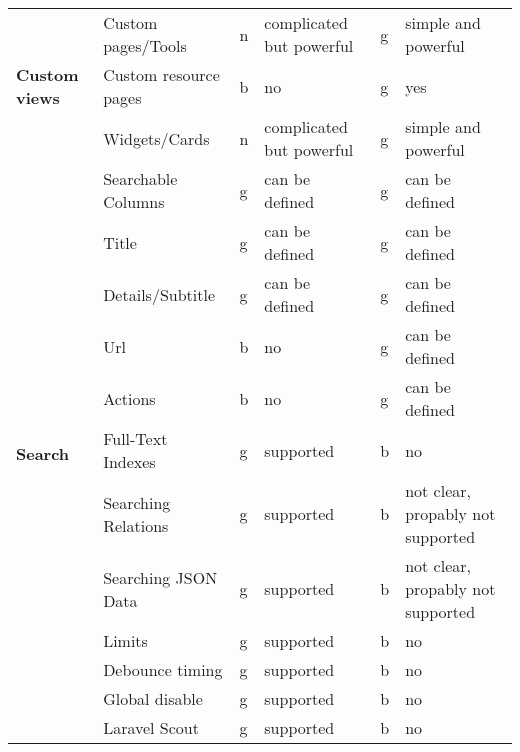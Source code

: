 \begin{table}[]
{\begin{tabular}{llllll}
            \hline
            \multirow{3}{*}{\textbf{Custom views}}   & Custom pages/Tools     & n  & complicated but powerful       & g  & simple and powerful                     \\
            & Custom resource pages  & b  & no                             & g  & yes                                     \\
            & Widgets/Cards          & n  & complicated but powerful       & g  & simple and powerful                     \\
            \hline
            \multirow{12}{*}{\textbf{Search}}        & Searchable Columns     & g  & can be defined                 & g  & can be defined                          \\
            & Title                  & g  & can be defined                 & g  & can be defined                          \\
            & Details/Subtitle       & g  & can be defined                 & g  & can be defined                          \\
            & Url                    & b  & no                             & g  & can be defined                          \\
            & Actions                & b  & no                             & g  & can be defined                          \\
            & Full-Text Indexes      & g  & supported                      & b  & no                                      \\
            & Searching Relations    & g  & supported                      & b  & not clear, propably not supported       \\
            & Searching JSON Data    & g  & supported                      & b  & not clear, propably not supported       \\
            & Limits                 & g  & supported                      & b  & no                                      \\
            & Debounce timing        & g  & supported                      & b  & no                                      \\
            & Global disable         & g  & supported                      & b  & no                                      \\
            & Laravel Scout          & g  & supported                      & b  & no                                      \\
            \hline

\end{tabular}}
\end{table}
